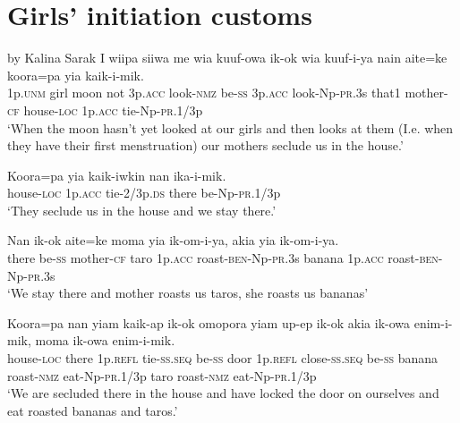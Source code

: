 \section{  Girls’ initiation customs }
 by Kalina Sarak
\ea\label{ex:a:x1}
\gll  I  wiipa  siiwa  me  wia  kuuf-owa  ik-ok  wia  kuuf-i-ya          nain  aite=ke  koora=pa  yia  kaik-i-mik. \\
1p.\textsc{unm}  girl  moon  not  3p.\textsc{acc}  look-\textsc{nmz}  be-\textsc{ss}  3p.\textsc{acc}  look-Np-\textsc{pr}.3s  that1  mother-\textsc{cf}  house-\textsc{loc}  1p.\textsc{acc}  tie-Np-\textsc{pr}.1/3p \\


\glt ‘When the moon hasn’t yet looked at our girls and then looks at them (I.e. when they have their first menstruation) our mothers seclude us in the house.’ \\
\z


\ea\label{ex:a:x2}
\gll  Koora=pa  yia  kaik-iwkin  nan  ika-i-mik. \\
house-\textsc{loc}  1p.\textsc{acc}  tie-2/3p.\textsc{ds}  there  be-Np-\textsc{pr}.1/3p \\
\glt ‘They seclude us in the house and we stay there.’ \\
\z


\ea\label{ex:a:x3}
\gll  Nan  ik-ok  aite=ke  moma  yia  ik-om-i-ya,          akia  yia  ik-om-i-ya. \\
there  be-\textsc{ss}  mother-\textsc{cf}  taro  1p.\textsc{acc}  roast-\textsc{ben}-Np-\textsc{pr}.3s  banana  1p.\textsc{acc}  roast-\textsc{ben}-Np-\textsc{pr}.3s \\


\glt ‘We stay there and mother roasts us taros, she roasts us bananas’ \\
\z


\ea\label{ex:a:x4}
\gll  Koora=pa  nan  yiam  kaik-ap  ik-ok  omopora  yiam  up-ep           ik-ok  akia  ik-owa  enim-i-mik,  moma  ik-owa  enim-i-mik. \\
house-\textsc{loc}  there  1p.\textsc{refl}  tie-\textsc{ss.seq}  be-\textsc{ss}  door  1p.\textsc{refl}  close-\textsc{ss.seq} be-\textsc{ss}  banana  roast-\textsc{nmz}  eat-Np-\textsc{pr}.1/3p  taro  roast-\textsc{nmz}  eat-Np-\textsc{pr}.1/3p \\


\glt ‘We are secluded there in the house and have locked the door on ourselves and eat roasted bananas and taros.’ \\
\z


